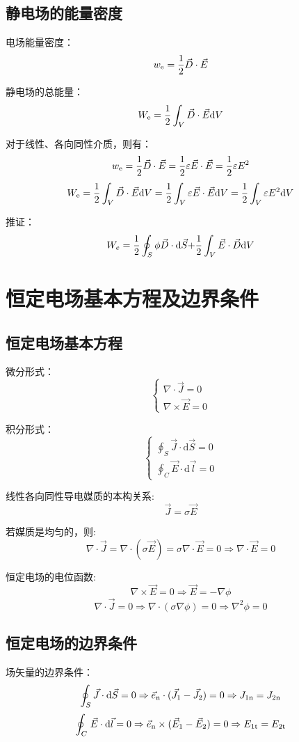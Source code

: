 \subsection*{静电场的能量密度}
电场能量密度：
$${w_{\rm{e}}} = {1 \over 2}\vec D \cdot \vec E$$

静电场的总能量：
$${W_{\rm{e}}} = {1 \over 2}\int_V {\vec D \cdot \vec E{\rm{d}}V} $$

对于线性、各向同性介质，则有：
$${w_{\rm{e}}} = {1 \over 2}\vec D \cdot \vec E = {1 \over 2}\varepsilon \vec E \cdot \vec E = {1 \over 2}\varepsilon {E^2}$$
$${W_{\rm{e}}} = {1 \over 2}\int_V {\vec D \cdot \vec E{\rm{d}}V}  = {1 \over 2}\int_V {\varepsilon \vec E \cdot \vec E{\rm{d}}V}  = {1 \over 2}\int_V {\varepsilon {E^2}{\rm{d}}V} $$

推证：
$$W_e = {1 \over 2}\oint_S {\phi \vec D \cdot {\rm{d}}\vec S + } {1 \over 2}\int_V {\vec E \cdot \vec D{\rm{d}}V} $$

\section{恒定电场基本方程及边界条件}
\subsection*{恒定电场基本方程}
微分形式：
$$\left\{
\begin{aligned}
	\nabla \cdot \vec{J} = 0 \\
	\nabla\times\vec{E} = 0
\end{aligned}
 \right.$$

积分形式：
$$\left\{
\begin{aligned}
	\oint_S\vec{J}\cdot\mathrm{d}\vec{S} = 0 \\
	\oint_C\vec{E}\cdot\mathrm{d}\vec{l} = 0
\end{aligned}
\right.$$

线性各向同性导电媒质的本构关系:
$$\vec{J} = \sigma\vec{E}$$

若媒质是均匀的，则:
$$\nabla  \cdot {\vec J} = \nabla  \cdot (\sigma \vec E) = \sigma \nabla  \cdot \vec E = 0 \Rightarrow \nabla\cdot\vec{E} = 0$$

恒定电场的电位函数:
$$\nabla  \times {\vec E} = 0 \Rightarrow \vec E =  - \nabla \phi $$
$$\nabla  \cdot {\vec J} = 0 \Rightarrow \nabla  \cdot (\sigma \nabla \phi ) = 0\Rightarrow{\nabla ^2}\phi = 0$$

\subsection*{恒定电场的边界条件}
场矢量的边界条件：
$$\oint_S {{\vec J}}  \cdot {\rm{d}}{\vec S} = 0 \Rightarrow {\vec e_{\rm{n}}} \cdot ({{\vec J}_1} - {{\vec J}_2}) = 0 \Rightarrow {J_{1{\rm{n}}}} = {J_{{\rm{2n}}}}$$
$$\oint_C {{\kern 1pt} {\vec E}}  \cdot {\rm{d}}{\vec l} = 0 \Rightarrow {\vec e_{\rm{n}}} \times ({{\vec E}_1} - {{\vec E}_2}) = 0 \Rightarrow {E_{{\rm{1t}}}} = {E_{{\rm{2t}}}}$$

